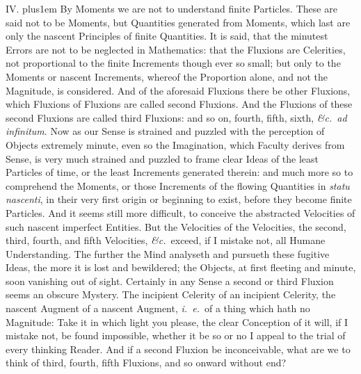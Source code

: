 
\medbreak

IV. \hskip 0pt plus1em
By Moments we are not to understand finite Particles.  These are
said not to be Moments, but Quantities generated from Moments,
which last are only the nascent Principles of finite Quantities.
It is said, that the minutest Errors are not to be neglected in
Mathematics: that the Fluxions are Celerities, not proportional
to the finite Increments though ever so small; but only to the
Moments or nascent Increments, whereof the Proportion alone, and
not the Magnitude, is considered.  And of the aforesaid Fluxions
there be other Fluxions, which Fluxions of Fluxions are called
second Fluxions.  And the Fluxions of these second Fluxions are
called third Fluxions: and so on, fourth, fifth, sixth,
{\it \&c.}\ {\it ad infinitum}.  Now as our Sense is strained and
puzzled with the perception of Objects extremely minute, even so
the Imagination, which Faculty derives from Sense, is very much
strained and puzzled to frame clear Ideas of the least Particles
of time, or the least Increments generated therein: and much more
so to comprehend the Moments, or those Increments of the flowing
Quantities in {\it statu nascenti}, in their very first origin or
beginning to exist, before they become finite Particles.  And it
seems still more difficult, to conceive the abstracted Velocities
of such nascent imperfect Entities.  But the Velocities of the
Velocities, the second, third, fourth, and fifth Velocities,
{\it \&c.}\ exceed, if I mistake not, all Humane Understanding.
The further the Mind analyseth and pursueth these fugitive Ideas,
the more it is lost and bewildered; the Objects, at first
fleeting and minute, soon vanishing out of sight.  Certainly in
any Sense a second or third Fluxion seems an obscure Mystery.
The incipient Celerity of an incipient Celerity, the nascent
Augment of a nascent Augment, {\it i.~e.}\ of a thing which hath
no Magnitude: Take it in which light you please, the clear
Conception of it will, if I mistake not, be found impossible,
whether it be so or no I appeal to the trial of every thinking
Reader.  And if a second Fluxion be inconceivable, what are we to
think of third, fourth, fifth Fluxions, and so onward without
end?


\medbreak

